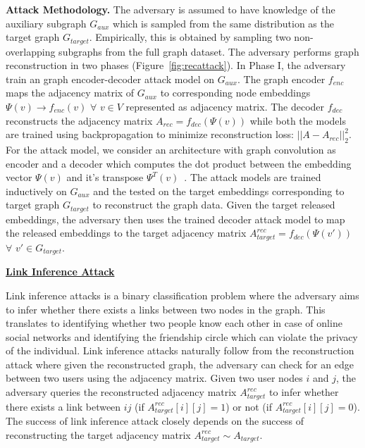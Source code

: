 \noindent\textbf{Attack Methodology.} The adversary is assumed to have knowledge of the auxiliary subgraph $G_{aux}$ which is sampled from the same distribution as the target graph $G_{target}$.
Empirically, this is obtained by sampling two non-overlapping subgraphs from the full graph dataset.
The adversary performs graph reconstruction in two phases (Figure~\ref{fig:recattack}).
In Phase I, the adversary train an graph encoder-decoder attack model on $G_{aux}$.
The graph encoder $f_{enc}$ maps the adjacency matrix of $G_{aux}$ to corresponding node embeddings $\Psi (v)\rightarrow f_{enc}(v)$ $\forall$ $v \in V$ represented as adjacency matrix.
The decoder $f_{dec}$ reconstructs the adjacency matrix $A_{rec} = f_{dec}(\Psi (v))$ while both the models are trained using backpropagation to minimize reconstruction loss: $||A - A_{rec}||_2^2$.
For the attack model, we consider an architecture with graph convolution as encoder and a decoder which computes the dot product between the embedding vector $\Psi (v)$ and it's transpose $\Psi^T (v)$~\cite{Kipf2016tc}.
The attack models are trained inductively on $G_{aux}$ and the tested on the target embeddings corresponding to target graph $G_{target}$ to reconstruct the graph data.
Given the target released embeddings, the adversary then uses the trained decoder attack model to map the released embeddings to the target adjacency matrix $A_{target}^{rec} = f_{dec}(\Psi (v'))$ $\forall$ $v'\in G_{target}$.

\noindent\textbf{\underline{Link Inference Attack}}

\noindent Link inference attacks is a binary classification problem where the adversary aims to infer whether there exists a links between two nodes in the graph.
This translates to identifying whether two people know each other in case of online social networks and identifying the friendship circle which can violate the privacy of the individual.
Link inference attacks naturally follow from the reconstruction attack where given the reconstructed graph, the adversary can check for an edge between two users using the adjacency matrix.
Given two user nodes $i$ and $j$, the adversary queries the reconstructed adjacency matrix $A_{target}^{rec}$ to infer whether there exists a link between $ij$ (if $A_{target}^{rec}[i][j] = 1$) or not (if $A_{target}^{rec}[i][j] = 0$).
The success of link inference attack closely depends on the success of reconstructing the target adjacency matrix $A_{target}^{rec} \sim A_{target}$.



